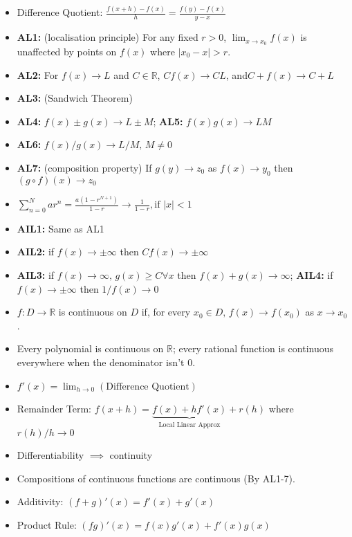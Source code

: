 \documentclass[10pt]{article}
\begin{document}

\begin{multicols}{2}
\begin{itemize}
    \item Difference Quotient: $\frac{f(x+h)-f(x)}{h}=\frac{f(y)-f(x)}{y-x}$
    \item \textbf{AL1:} (localisation principle) For any fixed $r>0$, $\lim_{x\to x_{0}}f(x)$ is unaffected by points on $f(x)$ where $|x_{0}-x|>r$.
    \item \textbf{AL2:} For $f(x)\to L$ and $C\in\mathbb{R}$, $Cf(x)\to CL$, and$C+f(x)\to C+L$
    \item\textbf{AL3:} (Sandwich Theorem)
    \item\textbf{AL4:} $f(x)\pm g(x)\to L\pm M$; \textbf{AL5:} $f(x)g(x)\to LM$
    \item\textbf{AL6:} $f(x)/g(x)\to L/M,\,M\neq0$
    \item\textbf{AL7:} (composition property) If $g(y)\to z_{0}$ as $f(x)\to y_{0}$ then$(g\circ f)(x)\to z_{0}$
    \item $\sum^{N}_{n=0}ar^{n}=\frac{a(1-r^{N+1})}{1-r}\to\frac{1}{1-r},\text{if $|x|<1$}$
    \item\textbf{AIL1:} Same as AL1
    \item\textbf{AIL2:} if $f(x)\to\pm\infty$ then $Cf(x)\to\pm\infty$
    \item\textbf{AIL3:} if $f(x)\to\infty,\,g(x)\geq C\forall x$ then $f(x)+g(x)\to\infty$; \textbf{AIL4:} if $f(x)\to\pm\infty$ then $1/f(x)\to0$
    \item $f:D\to\mathbb{R}$ is continuous on $D$ if, for every $x_{0}\in D,\,f(x)\to f(x_{0})$ as $x\to x_{0}$.
    \item Every polynomial is continuous on $\mathbb{R}$; every rational function is continuous everywhere when the denominator isn't 0.
    \item $f'(x)=\lim_{h\to0}(\text{Difference Quotient})$
    \item Remainder Term: $f(x+h)=\underbrace{f(x)+hf'(x)}_{\text{Local Linear Approx}}+r(h)$ where $r(h)/h\to0$
    \item Differentiability $\implies$ continuity
    \item Compositions of continuous functions are continuous (By AL1-7).
    \item Additivity: $(f+g)'(x)=f'(x)+g'(x)$
    \item Product Rule: $(fg)'(x)=f(x)g'(x)+f'(x)g(x)$

\end{itemize}
\end{multicols}
\end{document}
